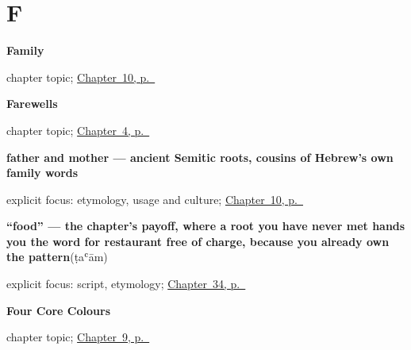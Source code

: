 \section*{F}

\noindent\begin{minipage}[t]{\linewidth}
\raggedright
\textbf{Family}\par
\footnotesize chapter topic; \hyperref[ch:ar-family]{Chapter~10, p.~\pageref*{ch:ar-family}}
\end{minipage}\par\smallskip

\noindent\begin{minipage}[t]{\linewidth}
\raggedright
\textbf{Farewells}\par
\footnotesize chapter topic; \hyperref[ch:ar-farewells]{Chapter~4, p.~\pageref*{ch:ar-farewells}}
\end{minipage}\par\smallskip

\noindent\begin{minipage}[t]{\linewidth}
\raggedright
\textbf{father and mother — ancient Semitic roots, cousins of Hebrew's own family words}\enspace\emph{ }\par
\footnotesize explicit focus: etymology, usage and culture; \hyperref[ch:ar-family]{Chapter~10, p.~\pageref*{ch:ar-family}}
\end{minipage}\par\smallskip

\noindent\begin{minipage}[t]{\linewidth}
\raggedright
\textbf{\textquotedblleft{}food\textquotedblright{} — the chapter's payoff, where a root you have never met hands you the word for restaurant free of charge, because you already own the pattern}\enspace\emph{}\enspace(ṭaʿām)\par
\footnotesize explicit focus: script, etymology; \hyperref[ch:ar-asking-for-food]{Chapter~34, p.~\pageref*{ch:ar-asking-for-food}}
\end{minipage}\par\smallskip

\noindent\begin{minipage}[t]{\linewidth}
\raggedright
\textbf{Four Core Colours}\par
\footnotesize chapter topic; \hyperref[ch:ar-core-colours]{Chapter~9, p.~\pageref*{ch:ar-core-colours}}
\end{minipage}\par\smallskip

